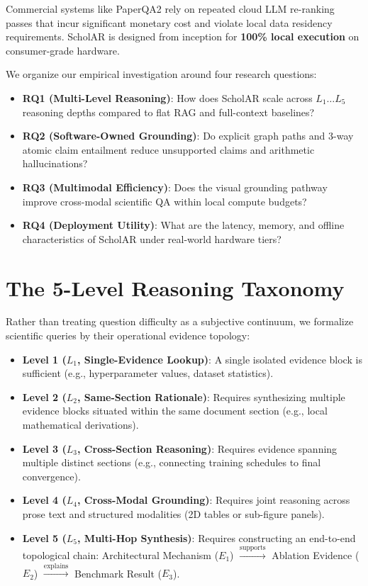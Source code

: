 \documentclass[11pt,a4paper]{article}
\begin{document}
Commercial systems like PaperQA2 rely on repeated cloud LLM re-ranking passes that incur significant monetary cost and violate local data residency requirements. ScholAR is designed from inception for \textbf{100\% local execution} on consumer-grade hardware.

We organize our empirical investigation around four research questions:
\begin{itemize}
    \item \textbf{RQ1 (Multi-Level Reasoning)}: How does ScholAR scale across $L_1 \dots L_5$ reasoning depths compared to flat RAG and full-context baselines?
    \item \textbf{RQ2 (Software-Owned Grounding)}: Do explicit graph paths and 3-way atomic claim entailment reduce unsupported claims and arithmetic hallucinations?
    \item \textbf{RQ3 (Multimodal Efficiency)}: Does the visual grounding pathway improve cross-modal scientific QA within local compute budgets?
    \item \textbf{RQ4 (Deployment Utility)}: What are the latency, memory, and offline characteristics of ScholAR under real-world hardware tiers?
\end{itemize}

\section{The 5-Level Reasoning Taxonomy}
Rather than treating question difficulty as a subjective continuum, we formalize scientific queries by their operational evidence topology:
\begin{itemize}
    \item \textbf{Level 1 ($L_1$, Single-Evidence Lookup)}: A single isolated evidence block is sufficient (e.g., hyperparameter values, dataset statistics).
    \item \textbf{Level 2 ($L_2$, Same-Section Rationale)}: Requires synthesizing multiple evidence blocks situated within the same document section (e.g., local mathematical derivations).
    \item \textbf{Level 3 ($L_3$, Cross-Section Reasoning)}: Requires evidence spanning multiple distinct sections (e.g., connecting training schedules to final convergence).
    \item \textbf{Level 4 ($L_4$, Cross-Modal Grounding)}: Requires joint reasoning across prose text and structured modalities (2D tables or sub-figure panels).
    \item \textbf{Level 5 ($L_5$, Multi-Hop Synthesis)}: Requires constructing an end-to-end topological chain: Architectural Mechanism ($E_1$) $\xrightarrow{\text{supports}}$ Ablation Evidence ($E_2$) $\xrightarrow{\text{explains}}$ Benchmark Result ($E_3$).
\end{itemize}
\end{document}
